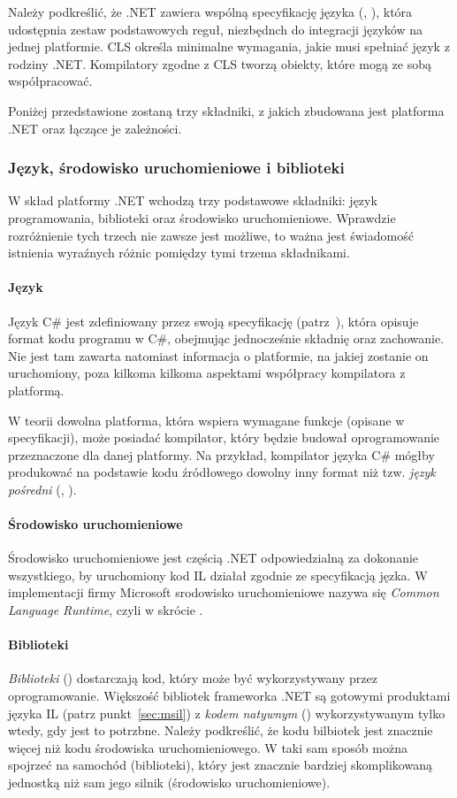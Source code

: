 Należy podkreślić, że .NET zawiera wspólną specyfikację języka (, ), która udostępnia zestaw podstawowych reguł, niezbędnch do integracji języków na jednej platformie. CLS określa minimalne wymagania, jakie musi spełniać język z rodziny .NET. Kompilatory zgodne z CLS tworzą obiekty, które mogą ze sobą współpracować.

Poniżej przedstawione zostaną trzy składniki, z jakich zbudowana jest platforma .NET oraz łączące je zależności.

\subsubsection{Język, środowisko uruchomieniowe i biblioteki}
W skład platformy .NET wchodzą trzy podstawowe składniki: język programowania, biblioteki oraz środowisko uruchomieniowe. Wprawdzie rozróżnienie tych trzech nie zawsze jest możliwe, to ważna jest świadomość istnienia wyraźnych różnic pomiędzy tymi trzema składnikami.

\paragraph{Język}
Język C\# jest zdefiniowany przez swoją specyfikację (patrz~\cite{cSharp:spec}), która opisuje format kodu programu w C\#, obejmując jednocześnie składnię oraz zachowanie. Nie jest tam zawarta natomiast informacja o platformie, na jakiej zostanie on uruchomiony, poza kilkoma kilkoma aspektami współpracy kompilatora z platformą. 

W teorii dowolna platforma, która wspiera wymagane funkcje (opisane w specyfikacji), może posiadać kompilator, który będzie budował oprogramowanie przeznaczone dla danej platformy.  Na przykład, kompilator języka C\# mógłby produkować na podstawie kodu źródłowego dowolny inny format niż tzw. \emph{język pośredni} (, ).

\paragraph{Środowisko uruchomieniowe}
Środowisko uruchomieniowe jest częścią .NET odpowiedzialną za dokonanie wszystkiego, by uruchomiony kod IL działał zgodnie ze specyfikacją jęzka. W implementacji firmy Microsoft srodowisko uruchomieniowe nazywa się \emph{Common Language Runtime}, czyli w skrócie .

\paragraph{Biblioteki}
\emph{Biblioteki} () dostarczają kod, który może być wykorzystywany przez oprogramowanie. Większość bibliotek frameworka .NET są gotowymi produktami języka IL (patrz punkt~\ref{sec:msil}) z \emph{kodem natywnym} () wykorzystywanym tylko wtedy, gdy jest to potrzbne. Należy podkreślić, że kodu bilbiotek jest znacznie więcej niż kodu środowiska uruchomieniowego. W taki sam sposób można spojrzeć na samochód (biblioteki), który jest znacznie bardziej skomplikowaną jednostką niż sam jego silnik (środowisko uruchomieniowe).

